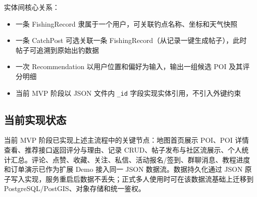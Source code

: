 实体间核心关系：

\begin{itemize}
  \item 一条 FishingRecord 隶属于一个用户，可关联钓点名称、坐标和天气快照
  \item 一条 CatchPost 可选关联一条 FishingRecord（从记录一键生成帖子），此时帖子可追溯到原始出钓数据
  \item 一次 Recommendation 以用户位置和偏好为输入，输出一组候选 POI 及其评分明细
  \item 当前 MVP 阶段以 JSON 文件内 \texttt{\_id} 字段实现实体引用，不引入外键约束
\end{itemize}

\subsection{当前实现状态}

当前 MVP 阶段已实现上述主流程中的关键节点：地图首页展示 POI、POI 详情查看、推荐接口返回评分与理由、记录 CRUD、帖子发布与社区流展示、个人统计汇总。评论、点赞、收藏、关注、私信、活动报名/签到、群聊消息、教程进度和订单演示已作为扩展 Demo 接入同一 JSON 数据流。数据持久化通过 JSON 原子写入实现，服务重启后数据不丢失；正式多人使用时可在该数据流基础上迁移到 PostgreSQL/PostGIS、对象存储和统一鉴权。
